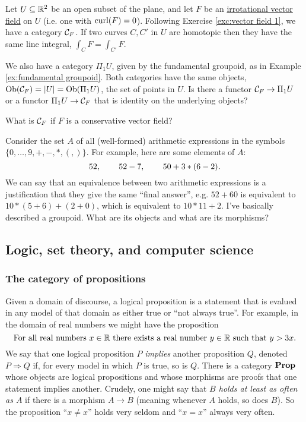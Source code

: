 \begin{exercise}
Let $U\subseteq{\mathbb R}^2$ be an open subset of the plane, and let $F$ be an \href{http://en.wikipedia.org/wiki/Conservative_vector_field#Irrotational_vector_fields}{\text irrotational vector field} on $U$ (i.e. one with $\textnormal{curl}(F)=0$). Following Exercise \ref{exc:vector field 1}, we have a category $\mathcal{C}_F$. If two curves $C,C'$ in $U$ are homotopic then they have the same line integral, $\int_CF=\int_{C'}F$.

We also have a category $\Pi_1U$, given by the fundamental groupoid, as in Example \ref{ex:fundamental groupoid}. Both categories have the same objects, $\textnormal{Ob}(\mathcal{C}_F)=|U|=\textnormal{Ob}(\Pi_1U)$, the set of points in $U$.
\sexc Is there a functor $\mathcal{C}_F\rightarrow\Pi_1U$ or a functor $\Pi_1U\rightarrow\mathcal{C}_F$ that is identity on the underlying objects? 
\item What is $\mathcal{C}_F$ if $F$ is a conservative vector field?
\endsexc
\end{exercise}

\begin{exercise}
Consider the set $A$ of all (well-formed) arithmetic expressions in the symbols $\{0,\ldots,9,+,-,*,(,)\}$. For example, here are some elements of $A$: $$52,\hspace{.3in} 52-7,\hspace{.3in} 50+3*(6-2).$$ We can say that an equivalence between two arithmetic expressions is a justification that they give the same “final answer”, e.g. $52+60$ is equivalent to $10*(5+6)+(2+0)$, which is equivalent to $10*11+2$. I've basically described a groupoid. What are its objects and what are its morphisms?
\end{exercise}


\subsection{Logic, set theory, and computer science}


\subsubsection{The category of propositions}\label{sec:propositions}

Given a domain of discourse, a logical proposition is a statement that is evalued in any model of that domain as either true or “not always true”. For example, in the domain of real numbers we might have the proposition 
$$\textnormal{For all real numbers }x\in{\mathbb R}\textnormal{ there exists a real number } y\in{\mathbb R}\textnormal{ such that }y>3x.$$
We say that one logical proposition $P$ {\em implies} another proposition $Q$, denoted $P\Rightarrow Q$ if, for every model in which $P$ is true, so is $Q$. There is a category ${\bf Prop}$ whose objects are logical propositions and whose morphisms are proofs that one statement implies another. Crudely, one might say that {\em $B$ holds at least as often as $A$} if there is a morphism $A\to B$ (meaning whenever $A$ holds, so does $B$). So the proposition “$x\neq x$” holds very seldom and “$x=x$” always very often.

